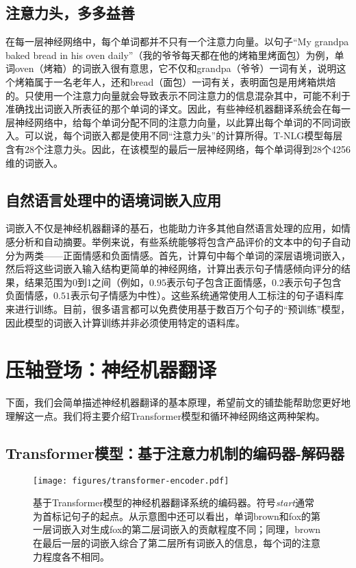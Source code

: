 \documentclass[output=paper,colorlinks,citecolor=brown]{langscibook}
\begin{document}
\subsection{注意力头，多多益善}
在每一层神经网络中，每个单词都并不只有一个注意力向量。以句子“My grandpa baked bread in his oven daily”（我的爷爷每天都在他的烤箱里烤面包）为例，单词oven（烤箱）的词嵌入很有意思，它不仅和grandpa（爷爷）一词有关，说明这个烤箱属于一名老年人，还和bread（面包）一词有关，表明面包是用烤箱烘焙的。只使用一个注意力向量就会导致表示不同注意力的信息混杂其中，可能不利于准确找出词嵌入所表征的那个单词的译文。因此，有些神经机器翻译系统会在每一层神经网络中，给每个单词分配不同的注意力向量，以此算出每个单词的不同词嵌入。可以说，每个词嵌入都是使用不同“注意力头”的计算所得。T-NLG模型每层含有$28$个注意力头。因此，在该模型的最后一层神经网络，每个单词得到28个4256维的词嵌入。



\subsection{自然语言处理中的语境词嵌入应用}
词嵌入不仅是神经机器翻译的基石，也能助力许多其他自然语言处理的应用，如情感分析和自动摘要。举例来说，有些系统能够将包含产品评价的文本中的句子自动分为两类——正面情感和负面情感。首先，计算句中每个单词的深层语境词嵌入，然后将这些词嵌入输入结构更简单的神经网络，计算出表示句子情感倾向评分的结果，结果范围为0到1之间（例如，$0.95$表示句子包含正面情感，$0.2$表示句子包含负面情感，$0.51$表示句子情感为中性）。这些系统通常使用人工标注的句子语料库来进行训练。目前，很多语言都可以免费使用基于数百万个句子的“预训练”模型，因此模型的词嵌入计算训练并非必须使用特定的语料库。


\section{压轴登场：神经机器翻译}
\label{se:nmtatlast}

下面，我们会简单描述神经机器翻译的基本原理，希望前文的铺垫能帮助您更好地理解这一点。我们将主要介绍Transformer模型和循环神经网络这两种架构。

\subsection{Transformer模型：基于注意力机制的编码器-解码器}
\label{se:transformer}

\begin{figure}
\texttt{[image: figures/transformer-encoder.pdf]}
\caption{基于Transformer模型的神经机器翻译系统的编码器。符号\emph{start}通常为首标记句子的起点。从示意图中还可以看出，单词brown和fox的第一层词嵌入对生成fox的第二层词嵌入的贡献程度不同；同理，brown在最后一层的词嵌入综合了第二层所有词嵌入的信息，每个词的注意力程度各不相同。}
\label{fg:transformer-encoder}
\end{figure}
\end{document}
